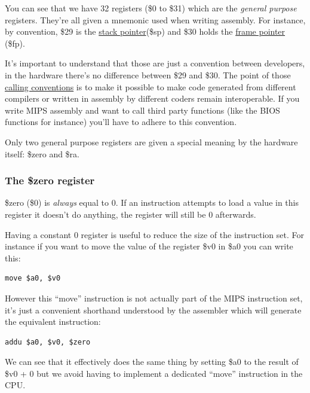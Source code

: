\documentclass[a4paper]{article}
\begin{document}
You can see that we have 32 registers (\$0 to \$31) which are the
\emph{general purpose} registers. They're all given a mnemonic used
when writing assembly. For instance, by convention, \$29 is the
\href{https://en.wikipedia.org/wiki/Call_stack}{stack pointer}(\$sp)
and \$30 holds the
\href{https://en.wikipedia.org/wiki/Call_stack#FRAME-POINTER}{frame
  pointer} (\$fp).

It's important to understand that those are just a convention between
developers, in the hardware there's no difference between \$29 and
\$30. The point of those
\href{https://en.wikipedia.org/wiki/Calling_convention}{calling
  conventions} is to make it possible to make code generated from
different compilers or written in assembly by different coders remain
interoperable. If you write MIPS assembly and want to call third party
functions (like the BIOS functions for instance) you'll have to adhere
to this convention.

Only two general purpose registers are given a special meaning by the
hardware itself: \$zero and \$ra.

\subsubsection{The \$zero register}

\$zero (\$0) is \emph{always} equal to 0. If an instruction attempts
to load a value in this register it doesn't do anything, the register
will still be 0 afterwards.

Having a constant 0 register is useful to reduce the size of the
instruction set. For instance if you want to move the value of the
register \$v0 in \$a0 you can write this:

\begin{lstlisting}[language=assembly]
move $a0, $v0
\end{lstlisting}

However this ``move'' instruction is not actually part of the MIPS
instruction set, it's just a convenient shorthand understood by the
assembler which will generate the equivalent instruction:

\begin{lstlisting}[language=assembly]
addu $a0, $v0, $zero
\end{lstlisting}

We can see that it effectively does the same thing by setting \$a0 to
the result of \$v0 + 0 but we avoid having to implement a dedicated
``move'' instruction in the CPU.
\end{document}
